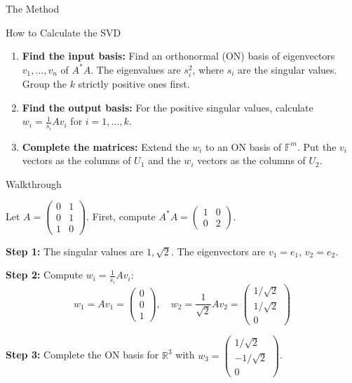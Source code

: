 \documentclass{beamer}
\begin{document}
\begin{frame}{The Method}
    \begin{block}{How to Calculate the SVD}
        \begin{enumerate}
            \item \textbf{Find the input basis:} Find an orthonormal (ON) basis of eigenvectors $v_1, \dots, v_n$ of $A^*A$. The eigenvalues are $s_i^2$, where $s_i$ are the singular values. Group the $k$ strictly positive ones first.
            \item \textbf{Find the output basis:} For the positive singular values, calculate $w_i = \frac{1}{s_i} A v_i$ for $i=1, \dots, k$.
            \item \textbf{Complete the matrices:} Extend the $w_i$ to an ON basis of $\mathbb{F}^m$. Put the $v_i$ vectors as the columns of $U_1$ and the $w_i$ vectors as the columns of $U_2$. 
        \end{enumerate}
    \end{block}
\end{frame}

\begin{frame}{Walkthrough}
    \begin{example}
    Let $A = \begin{pmatrix} 0 & 1 \\ 0 & 1 \\ 1 & 0 \end{pmatrix}$. First, compute $A^*A = \begin{pmatrix} 1 & 0 \\ 0 & 2 \end{pmatrix}$.
    
    \vspace{0.2cm}
    \textbf{Step 1:} The singular values are $1, \sqrt{2}$. The eigenvectors are $v_1 = e_1$, $v_2 = e_2$.
    
    \vspace{0.2cm}
    \textbf{Step 2:} Compute $w_i = \frac{1}{s_i} A v_i$:
    \[ w_1 = A v_1 = \begin{pmatrix} 0 \\ 0 \\ 1 \end{pmatrix}, \quad w_2 = \frac{1}{\sqrt{2}} A v_2 = \begin{pmatrix} 1/\sqrt{2} \\ 1/\sqrt{2} \\ 0 \end{pmatrix} \]
    
    \textbf{Step 3:} Complete the ON basis for $\mathbb{R}^3$ with $w_3 = \begin{pmatrix} 1/\sqrt{2} \\ -1/\sqrt{2} \\ 0 \end{pmatrix}$.
    \end{example}
\end{frame}
\end{document}
